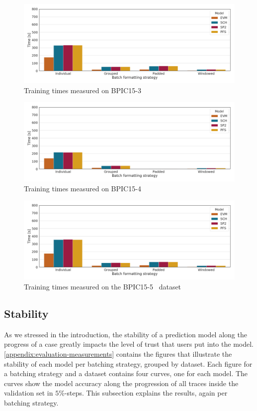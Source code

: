 \begin{figure}
    \centering
    \includegraphics[width=\textwidth]{gfx/bpic2015_3/train_timings.png}
    \caption{Training times measured on BPIC15-3~\cite{BPIC2015}}
    \label{fig:BPIC15-3-training-timings}
\end{figure}
\begin{figure}
    \centering
    \includegraphics[width=\textwidth]{gfx/bpic2015_4/train_timings.png}
    \caption{Training times measured on BPIC15-4~\cite{BPIC2015}}
    \label{fig:BPIC15-4-training-timings}
\end{figure}
\begin{figure}
    \centering
    \includegraphics[width=\textwidth]{gfx/bpic2015_5/train_timings.png}
    \caption{Training times measured on the BPIC15-5~\cite{BPIC2015} dataset}
    \label{fig:BPIC15-5-training-timings}
\end{figure}

\FloatBarrier
\subsection*{Stability}
As we stressed in the introduction, the stability of a prediction model along the progress of a case greatly impacts the level of trust that users put into the model. \autoref{appendix:evaluation-measurements} contains the figures that illustrate the stability of each model per batching strategy, grouped by dataset. Each figure for a batching strategy and a dataset contains four curves, one for each model. The curves show the model accuracy along the progression of all traces inside the validation set in $5\%$-steps. This subsection explains the results, again per batching strategy.\\

